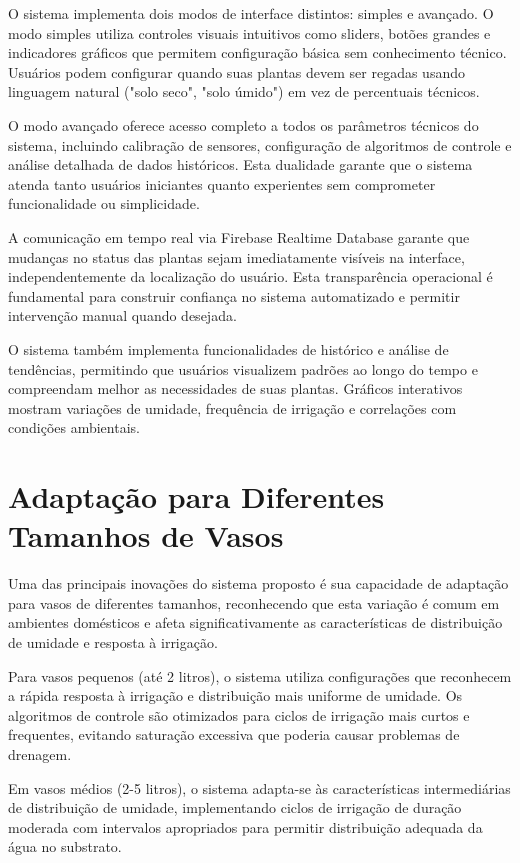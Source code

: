 O sistema implementa dois modos de interface distintos: simples e avançado. O modo simples utiliza controles visuais intuitivos como sliders, botões grandes e indicadores gráficos que permitem configuração básica sem conhecimento técnico. Usuários podem configurar quando suas plantas devem ser regadas usando linguagem natural ("solo seco", "solo úmido") em vez de percentuais técnicos.

O modo avançado oferece acesso completo a todos os parâmetros técnicos do sistema, incluindo calibração de sensores, configuração de algoritmos de controle e análise detalhada de dados históricos. Esta dualidade garante que o sistema atenda tanto usuários iniciantes quanto experientes sem comprometer funcionalidade ou simplicidade.

A comunicação em tempo real via Firebase Realtime Database garante que mudanças no status das plantas sejam imediatamente visíveis na interface, independentemente da localização do usuário. Esta transparência operacional é fundamental para construir confiança no sistema automatizado e permitir intervenção manual quando desejada.

O sistema também implementa funcionalidades de histórico e análise de tendências, permitindo que usuários visualizem padrões ao longo do tempo e compreendam melhor as necessidades de suas plantas. Gráficos interativos mostram variações de umidade, frequência de irrigação e correlações com condições ambientais.

\section{Adaptação para Diferentes Tamanhos de Vasos}

Uma das principais inovações do sistema proposto é sua capacidade de adaptação para vasos de diferentes tamanhos, reconhecendo que esta variação é comum em ambientes domésticos e afeta significativamente as características de distribuição de umidade e resposta à irrigação.

Para vasos pequenos (até 2 litros), o sistema utiliza configurações que reconhecem a rápida resposta à irrigação e distribuição mais uniforme de umidade. Os algoritmos de controle são otimizados para ciclos de irrigação mais curtos e frequentes, evitando saturação excessiva que poderia causar problemas de drenagem.

Em vasos médios (2-5 litros), o sistema adapta-se às características intermediárias de distribuição de umidade, implementando ciclos de irrigação de duração moderada com intervalos apropriados para permitir distribuição adequada da água no substrato.

